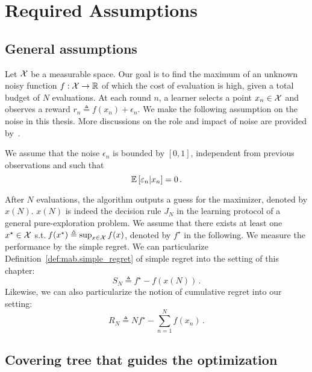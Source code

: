 \section{Required Assumptions}\label{sec:gpo.pre}

\subsection{General assumptions}\label{sec:gpo.pre.general}
Let $\mathcal{X}$ be a measurable space. Our goal is to find the maximum of an unknown noisy function $f:\mathcal{X}\rightarrow\mathbb{R}$ of which the cost of evaluation is high, given a total budget of $N$ evaluations. At each round $n$, a learner selects a point $x_n\in\mathcal{X}$ and observes a reward $r_n\triangleq f(x_n)+\epsilon_n$. We make the following assumption on the noise in this thesis. More discussions on the role and impact of noise are provided by~\cite{bartlett2019simple}.
\begin{assumption}
\begin{leftbar}
We assume that the noise $\epsilon_n$ is bounded by $[0,1]$, independent from previous observations and such that 
\[
    \mathbb{E}\left[\varepsilon_n|x_n\right] = 0\,.
\]
\end{leftbar}
\end{assumption}

After $N$ evaluations, the algorithm outputs a guess for the maximizer, denoted by $x(N)$. $x(N)$ is indeed the decision rule $J_N$ in the learning protocol of a general pure-exploration problem. We assume that there exists at least one $x^\star \in \mathcal{X}$ s.t.\,$f(x^\star) \triangleq \sup_{x\in\mathcal{X}} f(x)$, denoted by $f^\star$ in the following. We measure the performance by the simple regret. We can particularize Definition~\ref{def:mab.simple_regret} of simple regret into the setting of this chapter:
\[
	S_N \triangleq f^\star - f(x(N))\,.
\]
Likewise, we can also particularize the notion of cumulative regret into our setting:
\[
	R_N \triangleq Nf^\star - \sum_{n=1}^N f(x_n)\,.
\]

\subsection{Covering tree that guides the optimization}\label{sec:gpo.pre.tree}

